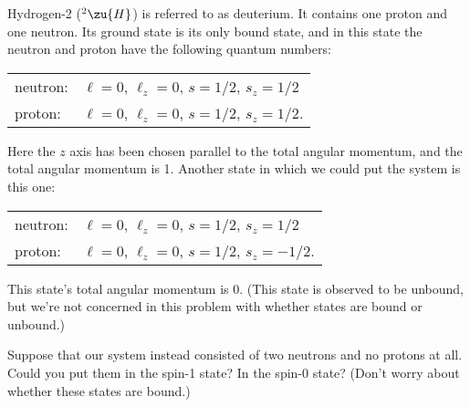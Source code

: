 Hydrogen-2 (${}^2\zu{H}$) is referred to as deuterium. It contains one proton
and one neutron. Its ground state is its only bound state, and in this state
the neutron and proton have the following quantum numbers:

\begin{tabular}{ll}
neutron:   &  $\ell=0$, $\ell_z=0$, $s=1/2$, $s_z=1/2$ \\
proton:    &  $\ell=0$, $\ell_z=0$, $s=1/2$, $s_z=1/2$.
\end{tabular}

\noindent Here the $z$ axis has been chosen parallel to the total angular momentum,
and the total angular momentum is 1. Another state in which we could put the system
is this one:

\begin{tabular}{ll}
neutron:   &  $\ell=0$, $\ell_z=0$, $s=1/2$, $s_z=1/2$ \\
proton:    &  $\ell=0$, $\ell_z=0$, $s=1/2$, $s_z=-1/2$.
\end{tabular}

\noindent This state's total angular momentum is 0. (This state is observed to
be unbound, but we're not concerned in this problem with whether states are
bound or unbound.)

Suppose that our system instead consisted of two neutrons and no protons at all.
Could you put them in the spin-1 state? In the spin-0 state?
(Don't worry about whether these states are bound.)
